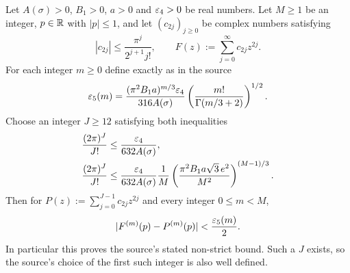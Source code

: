 \documentclass[11pt]{article}
\begin{document}
\begin{agammaproposition}\label{agamma:prop:taylor}
Let $A(\sigma)>0$, $B_1>0$, $a>0$ and $\varepsilon_4>0$ be real numbers.
Let $M\ge1$ be an integer, $p\in\mathbb R$ with $|p|\le1$, and let
$(c_{2j})_{j\ge0}$ be complex numbers satisfying
\begin{equation}\label{agamma:eq:coefficient-bound}
|c_{2j}|\le\frac{\pi^j}{2^{j+1}j!},\qquad
F(z):=\sum_{j=0}^\infty c_{2j}z^{2j}.
\end{equation}
For each integer $m\ge0$ define exactly as in the source
\begin{equation}\label{agamma:eq:epsilon5}
\varepsilon_5(m)=\frac{(\pi^2B_1a)^{m/3}\varepsilon_4}{316 A(\sigma)}
\left(\frac{m!}{\Gamma(m/3+2)}\right)^{1/2}.
\end{equation}
Choose an integer $J\ge12$ satisfying both inequalities
\begin{align}
\frac{(2\pi)^J}{J!}&\le\frac{\varepsilon_4}{632 A(\sigma)},\label{agamma:eq:Jfirst}\\
\frac{(2\pi)^J}{J!}&\le\frac{\varepsilon_4}{632 A(\sigma)}\frac1M
\left(\frac{\pi^2 B_1a\sqrt3\,e^2}{M^2}\right)^{(M-1)/3}.
\label{agamma:eq:Jsecond}
\end{align}
Then for $P(z):=\sum_{j=0}^{J-1}c_{2j}z^{2j}$ and every integer
$0\le m<M$,
\begin{equation}\label{agamma:eq:taylor-conclusion}
|F^{(m)}(p)-P^{(m)}(p)|<\frac{\varepsilon_5(m)}2.
\end{equation}
In particular this proves the source's stated non-strict bound.
Such a $J$ exists, so the source's choice of the first such integer
is also well defined.
\end{agammaproposition}
\end{document}

